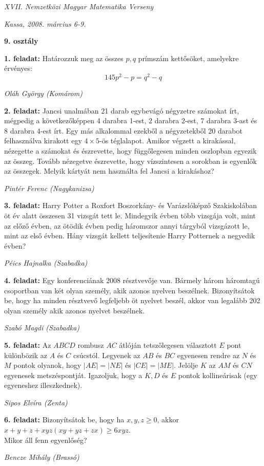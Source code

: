 \documentclass[a4paper,10pt]{article}
\def\ki#1#2{\hfill {\it #1 (#2)}\medskip}
\begin{document}
\begin{center} \Large {\em XVII. Nemzetközi Magyar Matematika Verseny} \end{center}
\begin{center} \large{\em Kassa, 2008. március 6-9.} \end{center}
\smallskip
\begin{center} \large{\bf 9. osztály} \end{center}
\bigskip 

{\bf 1. feladat: } Határozzuk meg az összes $p, q$ prímszám kettősöket, amelyekre érvényes:
$$ 145p^2-p=q^2-q$$

\ki{Oláh György}{Komárom}\medskip

{\bf 2. feladat: } 
Jancsi unalmában 21 darab egybevágó négyzetre számokat írt, 
mégpedig a következőképpen
4 darabra 1-est, 
2 darabra 2-est, 
7 darabra 3-ast és 8 darabra 4-est írt. 
Egy más alkalommal ezekből a négyzetekből 20 darabot felhasználva kirakott egy $4 \times 5$-ös téglalapot. 
Amikor végzett a kirakással, nézegette a számokat és észrevette, hogy függőlegesen minden oszlopban egyezik az összeg. 
Tovább nézegetve észrevette, hogy vízszintesen a sorokban is egyenlők az összegek. 
Melyik kártyát nem használta fel Jancsi a kirakáshoz?

\ki{Pintér Ferenc}{Nagykanizsa}\medskip

{\bf 3. feladat: } Harry Potter a Roxfort Boszorkány- és Varázslóképző Szakiskolában öt év alatt összesen 31 vizsgát tett le. Mindegyik évben több vizsgája volt, mint az előző évben, az ötödik évben pedig háromszor annyi tárgyból vizsgázott le, mint az első évben. Hány vizsgát kellett teljesítenie Harry Potternek a negyedik évben?

\ki{Péics Hajnalka}{Szabadka}\medskip

{\bf 4. feladat: } Egy konferenciának 2008 résztvevője van. Bármely három háromtagú csoportban van két olyan személy,  akik azonos nyelven beszélnek. Bizonyítsátok be, hogy ha minden résztvevő legfeljebb öt nyelvet beszél, akkor van legalább 202 olyan személy akik azonos nyelvet beszélnek.

\ki{Szabó Magdi}{Szabadka}\medskip

{\bf 5. feladat: } Az $ABCD$ rombusz $AC$ átlóján tetszőlegesen választott $E$  pont különbözik az $A$ és  $C$ csúcstól. Legyenek  az $AB$ és $BC$  egyenesen rendre az $N$ és $M$ pontok olyanok, hogy $|AE|=|NE|$ és $|CE|=|ME|$. Jelölje  $K$ az $AM$ és $CN$  egyenesek metszéspontját. Igazoljuk, hogy a  $K, D$ és $E$  pontok kollineárisak (egy egyeneshez illeszkednek).

\ki{Sipos Elvíra}{Zenta}\medskip

{\bf 6. feladat: } Bizonyítsátok be, hogy ha $x, y, z\ge 0$, akkor 
$x+y+z+xyz(xy+yz+zx)\ge 6xyz$.\\ 
Mikor áll fenn egyenlőség? 

\ki{Bencze Mihály}{Brassó}\medskip

\vfill
\end{document}
